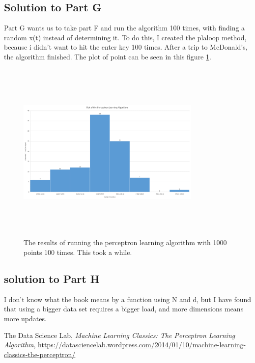 \documentclass[a4paper]{article}
\begin{document}
\subsection{Solution to Part G}
Part G wants us to take part F and run the algorithm 100 times, with finding a random x(t) instead of determining it. To do this, I created the plaloop method, because i didn't want to hit the enter key 100 times. After a trip to McDonald's, the algorithm finished. The plot of point can be seen in this figure \ref{fig:PartG}.

\begin{figure}
  \includegraphics[width=9cm,height=9cm]{histogram.png}
  \caption{The results of running the perceptron learning algorithm with 1000 points 100 times. This took a while.}
  \label{fig:PartG}
\end{figure}

\subsection{solution to Part H}
I don't know what the book means by a function using N and d, but I have found that using a bigger data set requires a bigger load, and more dimensions means more updates.

\begin{thebibliography}{9}

  The Data Science Lab,
  \emph{Machine Learning Classics: The Perceptron Learning Algorithm},
   \url{https://datasciencelab.wordpress.com/2014/01/10/machine-learning-classics-the-perceptron/}

\end{thebibliography}
\end{document}

